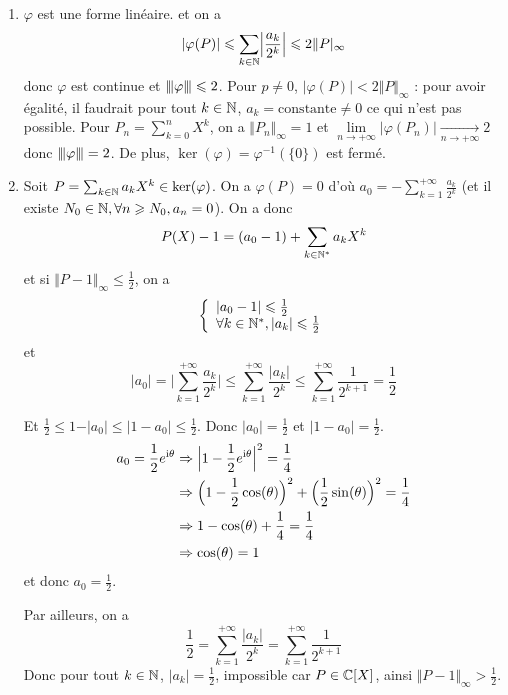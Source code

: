 \begin{solution}
	\phantom{}
	\begin{enumerate}
		\item $\varphi$ est une forme linéaire. et on a 
		$$\vert\varphi(P)\vert\leqslant\sum_{k\in\mathbb{N}}\Bigl\vert\frac{a_k}{2^{k}}\Bigr\vert\leqslant2\Vert P\vert_{\infty}$$
		donc $\varphi$ est continue et ${\left\vert\kern-0.25ex\left\vert\kern-0.25ex\left\vert{}\varphi \right\vert\kern-0.25ex\right\vert\kern-0.25ex\right\vert}\leqslant2$. Pour $p\neq0$, $\vert\varphi(P)\vert<2\Vert P\Vert_{\infty}$ : pour avoir égalité, il faudrait pour tout $k\in\mathbb{N}$, $a_{k}=\text{constante}\neq0$ ce qui n'est pas possible. Pour $P_{n}=\sum_{k=0}^{n}X^{k}$, on a $\Vert P_{n}\Vert_{\infty}=1$ et $\lim\limits_{n\to+\infty}\vert\varphi(P_{n})\vert\xrightarrow[n\to+\infty]{}2$ donc ${\left\vert\kern-0.25ex\left\vert\kern-0.25ex\left\vert{}\varphi \right\vert\kern-0.25ex\right\vert\kern-0.25ex\right\vert}=2$. De plus, $\ker(\varphi)=\varphi^{-1}(\{0\})$ est fermé.

		\item Soit $P=\sum_{k\in\mathbb{N}}a_{k}X^{k}\in\ker(\varphi)$. On a $\varphi(P)=0$ d'où $a_{0}=-\sum_{k=1}^{+\infty}\frac{a_{k}}{2^{k}}$ (et il existe $N_{0}\in\mathbb{N},\forall n\geqslant N_{0},a_{n}=0$). On a donc 
		$$P(X)-1=(a_{0}-1)+\sum_{k\in\mathbb{N}^{*}}a_{k}X^{k}$$
		et si $\Vert P-1\Vert_{\infty}\leqslant\frac{1}{2}$, on a 
		$$
		\left\{
			\begin{array}[]{l}
				\vert a_{0}-1\vert\leqslant\frac{1}{2}\\
				\forall k\in\N^{*},\vert a_{k}\vert\leqslant\frac{1}{2}
			\end{array}
		\right.
		$$
		et 
		$$\vert a_{0}\vert=\Biggl\vert\sum_{k=1}^{+\infty}\frac{a_{k}}{2^{k}}\Biggr\vert\leqslant\sum_{k=1}^{+\infty}\frac{\vert a_{k}\vert}{2^{k}}\leqslant\sum_{k=1}^{+\infty}\frac{1}{2^{k+1}}=\frac{1}{2}$$

		Et $\frac{1}{2}\leqslant 1-\vert a_{0}\vert\leqslant\vert 1-a_{0}\vert\leqslant\frac{1}{2}$. Donc $\vert a_{0}\vert=\frac{1}{2}$ et $\vert 1-a_{0}\vert=\frac{1}{2}$.
		\begin{align*}
			a_{0}=\frac{1}{2}e^{\mathrm{i}\theta}
			&\Rightarrow \Bigl\vert 1-\frac{1}{2}e^{\mathrm{i}\theta}\Bigr\vert^{2}=\frac{1}{4}\\
			&\Rightarrow \Bigl(1-\frac{1}{2}\cos(\theta)\Bigr)^{2}+\Bigl(\frac{1}{2}\sin(\theta)\Bigr)^{2}=\frac{1}{4}\\
			&\Rightarrow 1-\cos(\theta)+\frac{1}{4}=\frac{1}{4}\\
			&\Rightarrow \cos(\theta)=1
		\end{align*}
		et donc $a_{0}=\frac{1}{2}$.

		Par ailleurs, on a 
		$$\frac{1}{2}=\sum_{k=1}^{+\infty}\frac{\vert a_{k}\vert}{2^{k}}=\sum_{k=1}^{+\infty}\frac{1}{2^{k+1}}$$
		Donc pour tout $k\in\mathbb{N}$, $\vert a_{k}\vert=\frac{1}{2}$, impossible car $P\in\mathbb{C}[X]$, ainsi $\Vert P-1\Vert_{\infty}>\frac{1}{2}$.


\end{enumerate}
\end{solution}
